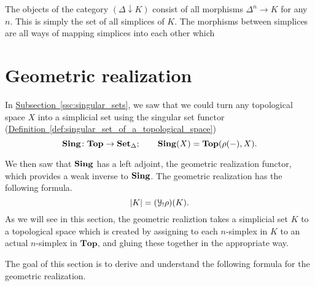 \documentclass[main.tex]{subfiles}
\begin{document}
The objects of the category $(\Delta \downarrow K)$ consist of all morphisms $\Delta^{n} \to K$ for any $n$. This is simply the set of all simplices of $K$. The morphisms between simplices are all ways of mapping simplices into each other which

\section{Geometric realization}
\label{sec:geometric_realization}

In \hyperref[ssc:singular_sets]{Subsection~\ref*{ssc:singular_sets}}, we saw that we could turn any topological space $X$ into a simplicial set using the singular set functor (\hyperref[def:singular_set_of_a_topological_space]{Definition~\ref*{def:singular_set_of_a_topological_space}})
\begin{equation*}
  \mathbf{Sing}\colon \mathbf{Top} \to \operatorname{\mathbf{Set}_{\Delta}};\qquad \mathbf{Sing}(X) = \mathbf{Top}(\rho(-), X).
\end{equation*}

We then saw that $\mathbf{Sing}$ has a left adjoint, the geometric realization functor, which provides a weak inverse to $\mathbf{Sing}$. The geometric realization has the following formula.
\begin{equation*}
  {| K |} = (\mathcal{Y}_{!}\rho)(K).
\end{equation*}
As we will see in this section, the geometric realiztion takes a simplicial set $K$ to a topological space which is created by assigning to each $n$-simplex in $K$ to an actual $n$-simplex in $\mathbf{Top}$, and gluing these together in the appropriate way.

The goal of this section is to derive and understand the following formula for the geometric realization.
\end{document}
